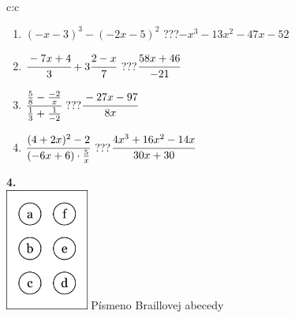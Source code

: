 \documentclass[10pt]{report}
\begin{document}
\begin{tabular}{c:c}
\begin{minipage}[c][104.5mm][t]{0.5\linewidth}
\begin{center}
\begin{minipage}{0.79\linewidth}
\begin{center}
\begin{varwidth}{\linewidth}
\begin{enumerate}
\item $(-x-3)^3-(-2x-5)^2$\quad \dotfill\; ???\;\dotfill \quad $-x^3-13x^2-47x-52$
\item $\cfrac{-7x+4}{3}+3\cfrac{2-x}{7}$\quad \dotfill\; ???\;\dotfill \quad $\cfrac{58x+46}{-21}$
\item $\cfrac{\frac{5}{8}-\frac{-2}{x}}{\frac{1}{3}+\frac{1}{-2}}$\quad \dotfill\; ???\;\dotfill \quad $\cfrac{-27x-97}{8x}$
\item $\cfrac{(4+2x)^2-2}{(-6x+6)\cdot\frac{5}{x}}$\quad \dotfill\; ???\;\dotfill \quad $\cfrac{4x^3+16x^2-14x}{30x+30}$
\end{enumerate}
\end{varwidth}
\end{center}
\end{minipage}
\begin{minipage}{0.20\linewidth}
\begin{center}
{\Huge\bfseries 4.} \\[2mm]
\includegraphics[height=40mm]{../images/braille.png}
{\small Písmeno Braillovej abecedy}
\end{center}
\end{minipage}
\end{center}
\end{minipage}
%
\end{tabular}
\newpage
\thispagestyle{empty}
\end{document}
